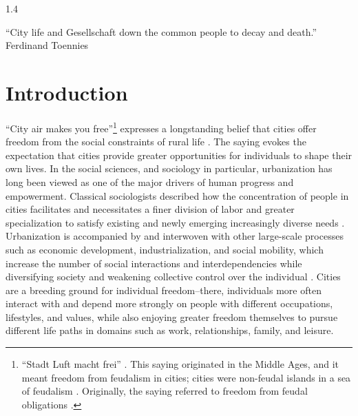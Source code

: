\documentclass[10pt, letterpaper]{article}
\begin{document}
\begin{spacing}{1.4} 

\noindent ``City life and Gesellschaft down the common people to decay and death.'' Ferdinand Toennies\\


\section{Introduction}
``City air makes you free''\footnote{``Stadt Luft macht frei''
  \citep[p. 12]{park84}. This saying originated in the Middle Ages, and it meant
  freedom from feudalism in cities; cities were non-feudal islands in a sea of
  feudalism \citep{harvey12}. Originally, the saying referred to freedom from
  feudal obligations \citep{harvey12,park84,yamagishi12}.}%
expresses a longstanding belief that cities offer freedom from the social constraints of rural life \citep{yamagishi12}. 
  The saying evokes the expectation that cities provide greater opportunities for individuals to shape their own lives. 
  In the social sciences, and %
  sociology in particular, urbanization has long been viewed as one of the major drivers of human progress and empowerment. Classical sociologists described how the concentration of people in cities facilitates and necessitates a finer division of labor and greater specialization to satisfy existing and newly emerging increasingly diverse needs \citep{durkheim2016,simmel1995}. 
Urbanization is accompanied by and interwoven with other large-scale processes such as economic development, industrialization, and social mobility, which increase the number of social interactions and interdependencies while diversifying society and weakening collective control over the individual \citep{durkheim2016,simmel1995}. Cities are a breeding ground for individual freedom--there, individuals more often interact with and depend more strongly on people with different occupations, lifestyles, and values, while also enjoying greater freedom themselves to pursue different life paths in domains such as work, relationships, family, and leisure. 


\end{spacing}
\end{document}
